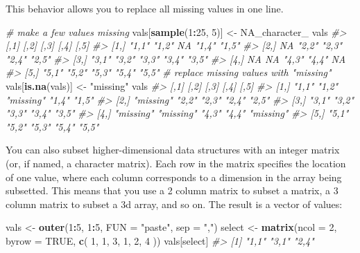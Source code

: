\documentclass[]{book}
\newenvironment{Shaded}{\begin{snugshade}}{\end{snugshade}}
\newcommand{\KeywordTok}[1]{\textcolor[rgb]{0.13,0.29,0.53}{\textbf{#1}}}
\newcommand{\DataTypeTok}[1]{\textcolor[rgb]{0.13,0.29,0.53}{#1}}
\newcommand{\DecValTok}[1]{\textcolor[rgb]{0.00,0.00,0.81}{#1}}
\newcommand{\StringTok}[1]{\textcolor[rgb]{0.31,0.60,0.02}{#1}}
\newcommand{\CommentTok}[1]{\textcolor[rgb]{0.56,0.35,0.01}{\textit{#1}}}
\newcommand{\OtherTok}[1]{\textcolor[rgb]{0.56,0.35,0.01}{#1}}
\newcommand{\OperatorTok}[1]{\textcolor[rgb]{0.81,0.36,0.00}{\textbf{#1}}}
\newcommand{\NormalTok}[1]{#1}
\theoremstyle{definition}
\theoremstyle{definition}
\theoremstyle{definition}
\theoremstyle{remark}
\begin{document}
This behavior allows you to replace all missing values in one line.

\begin{Shaded}
\begin{Highlighting}[]
\CommentTok{# make a few values missing}
\NormalTok{vals[}\KeywordTok{sample}\NormalTok{(}\DecValTok{1}\OperatorTok{:}\DecValTok{25}\NormalTok{, }\DecValTok{5}\NormalTok{)] <-}\StringTok{ }\OtherTok{NA_character_}
\NormalTok{vals}
\CommentTok{#>      [,1]  [,2]  [,3]  [,4]  [,5] }
\CommentTok{#> [1,] "1,1" "1,2" NA    "1,4" "1,5"}
\CommentTok{#> [2,] NA    "2,2" "2,3" "2,4" "2,5"}
\CommentTok{#> [3,] "3,1" "3,2" "3,3" "3,4" "3,5"}
\CommentTok{#> [4,] NA    NA    "4,3" "4,4" NA   }
\CommentTok{#> [5,] "5,1" "5,2" "5,3" "5,4" "5,5"}
\CommentTok{# replace missing values with "missing"}
\NormalTok{vals[}\KeywordTok{is.na}\NormalTok{(vals)] <-}\StringTok{ "missing"}
\NormalTok{vals}
\CommentTok{#>      [,1]      [,2]      [,3]      [,4]  [,5]     }
\CommentTok{#> [1,] "1,1"     "1,2"     "missing" "1,4" "1,5"    }
\CommentTok{#> [2,] "missing" "2,2"     "2,3"     "2,4" "2,5"    }
\CommentTok{#> [3,] "3,1"     "3,2"     "3,3"     "3,4" "3,5"    }
\CommentTok{#> [4,] "missing" "missing" "4,3"     "4,4" "missing"}
\CommentTok{#> [5,] "5,1"     "5,2"     "5,3"     "5,4" "5,5"}
\end{Highlighting}
\end{Shaded}

You can also subset higher-dimensional data structures with an integer
matrix (or, if named, a character matrix). Each row in the matrix
specifies the location of one value, where each column corresponds to a
dimension in the array being subsetted. This means that you use a 2
column matrix to subset a matrix, a 3 column matrix to subset a 3d
array, and so on. The result is a vector of values:

\begin{Shaded}
\begin{Highlighting}[]
\NormalTok{vals <-}\StringTok{ }\KeywordTok{outer}\NormalTok{(}\DecValTok{1}\OperatorTok{:}\DecValTok{5}\NormalTok{, }\DecValTok{1}\OperatorTok{:}\DecValTok{5}\NormalTok{, }\DataTypeTok{FUN =} \StringTok{"paste"}\NormalTok{, }\DataTypeTok{sep =} \StringTok{","}\NormalTok{)}
\NormalTok{select <-}\StringTok{ }\KeywordTok{matrix}\NormalTok{(}\DataTypeTok{ncol =} \DecValTok{2}\NormalTok{, }\DataTypeTok{byrow =} \OtherTok{TRUE}\NormalTok{, }\KeywordTok{c}\NormalTok{(}
  \DecValTok{1}\NormalTok{, }\DecValTok{1}\NormalTok{,}
  \DecValTok{3}\NormalTok{, }\DecValTok{1}\NormalTok{,}
  \DecValTok{2}\NormalTok{, }\DecValTok{4}
\NormalTok{))}
\NormalTok{vals[select]}
\CommentTok{#> [1] "1,1" "3,1" "2,4"}
\end{Highlighting}
\end{Shaded}
\end{document}

